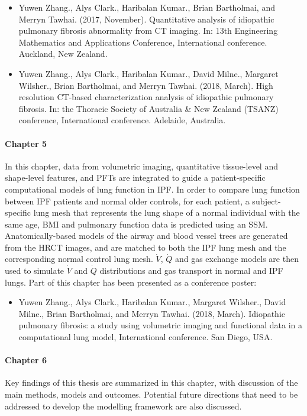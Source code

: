 \begin{itemize}
  \item Yuwen Zhang., Alys Clark., Haribalan Kumar., Brian Bartholmai, and Merryn Tawhai. (2017, November). Quantitative analysis of idiopathic pulmonary fibrosis abnormality from CT imaging. In: 13th Engineering Mathematics and Applications Conference, International conference. Auckland, New Zealand.
	\item Yuwen Zhang., Alys Clark., Haribalan Kumar., David Milne., Margaret Wilsher., Brian Bartholmai, and Merryn Tawhai. (2018, March). High resolution CT-based characterization analysis of idiopathic pulmonary fibrosis. In: the Thoracic Society of Australia \& New Zealand (TSANZ) conference, International conference. Adelaide, Australia.
\end{itemize}

\paragraph{Chapter 5} In this chapter, data from volumetric imaging, quantitative tissue-level and shape-level features, and PFTs are integrated to guide a patient-specific computational models of lung function in IPF. In order to compare lung function between IPF patients and normal older controls, for each patient, a subject-specific lung mesh that represents the lung shape of a normal individual with the same age, BMI and pulmonary function data is predicted using an SSM. Anatomically-based models of the airway and blood vessel trees are generated from the HRCT images, and are matched to both the IPF lung mesh and the corresponding normal control lung mesh. $\dot{V}$, $\dot{Q}$ and gas exchange models are then used to simulate $\dot{V}$ and $\dot{Q}$ distributions and gas transport in normal and IPF lungs. Part of this chapter has been presented as a conference poster:

\begin{itemize}
  \item Yuwen Zhang., Alys Clark., Haribalan Kumar., Margaret Wilsher., David Milne., Brian Bartholmai, and Merryn Tawhai. (2018, March). Idiopathic pulmonary fibrosis: a study using volumetric imaging and functional data in a computational lung model, International conference. San Diego, USA.
\end{itemize}

\paragraph{Chapter 6} Key findings of this thesis are summarized in this chapter, with discussion of the main methods, models and outcomes. Potential future directions that need to be addressed to develop the modelling framework are also discussed. 

